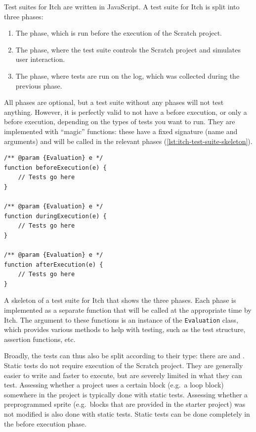 \documentclass[../main]{subfiles}
\begin{document}
Test suites for Itch are written in JavaScript.
A test suite for Itch is split into three phases:

\begin{enumerate}
    \item The  phase, which is run before the execution of the Scratch project.
    \item The  phase, where the test suite controls the Scratch project and simulates user interaction.
    \item The  phase, where tests are run on the log, which was collected during the previous phase.
\end{enumerate}

All phases are optional, but a test suite without any phases will not test anything.
However, it is perfectly valid to not have a before execution, or only a before execution, depending on the types of tests you want to run.
They are implemented with ``magic'' functions: these have a fixed signature (name and arguments) and will be called in the relevant phases (\cref{lst:itch-test-suite-skeleton}).

\begin{listing}
    \begin{verbatim}
/** @param {Evaluation} e */
function beforeExecution(e) {
    // Tests go here
}

/** @param {Evaluation} e */
function duringExecution(e) {
    // Tests go here
}

/** @param {Evaluation} e */
function afterExecution(e) {
    // Tests go here
}
    \end{verbatim}
    \caption[]{
        A skeleton of a test suite for Itch that shows the three phases.
        Each phase is implemented as a separate function that will be called at the appropriate time by Itch.
        The argument to these functions is an instance of the \texttt{Evaluation} class, which provides various methods to help with testing, such as the test structure, assertion functions, etc.
    }
    \label{lst:itch-test-suite-skeleton}
\end{listing}

Broadly, the tests can thus also be split according to their type: there are  and .
Static tests do not require execution of the Scratch project.
They are generally easier to write and faster to execute, but are severely limited in what they can test.
Assessing whether a project uses a certain block (e.g.\ a loop block) somewhere in the project is typically done with static tests.
Assessing whether a preprogrammed sprite (e.g.\ blocks that are provided in the starter project) was not modified is also done with static tests.
Static tests can be done completely in the before execution phase.
\end{document}
